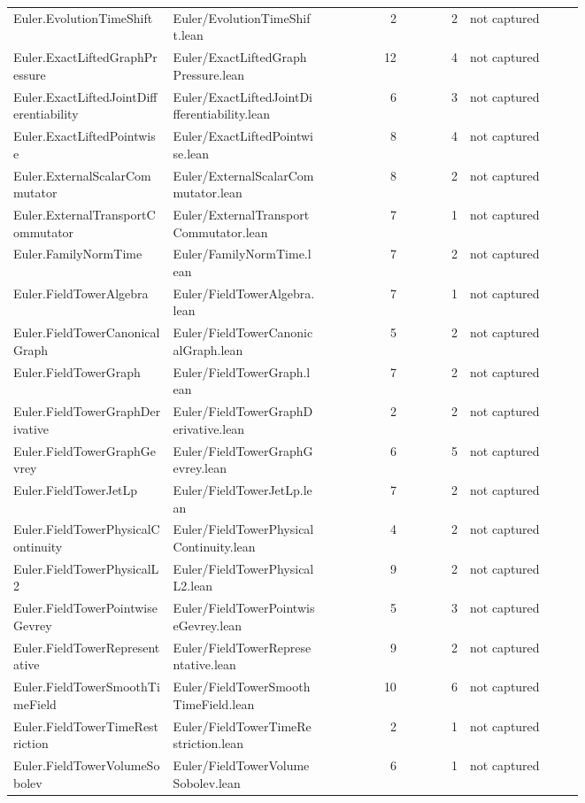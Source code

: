 \documentclass[10pt]{article}
\begin{document}
\begin{longtable}{p{0.28\linewidth}p{0.27\linewidth}r r p{0.20\linewidth}}
Euler.EvolutionTimeShift & Euler/EvolutionTimeShift.lean & 2 & 2 & not captured\\
Euler.ExactLiftedGraphPressure & Euler/ExactLiftedGraphPressure.lean & 12 & 4 & not captured\\
Euler.ExactLiftedJointDifferentiability & Euler/ExactLiftedJointDifferentiability.lean & 6 & 3 & not captured\\
Euler.ExactLiftedPointwise & Euler/ExactLiftedPointwise.lean & 8 & 4 & not captured\\
Euler.ExternalScalarCommutator & Euler/ExternalScalarCommutator.lean & 8 & 2 & not captured\\
Euler.ExternalTransportCommutator & Euler/ExternalTransportCommutator.lean & 7 & 1 & not captured\\
Euler.FamilyNormTime & Euler/FamilyNormTime.lean & 7 & 2 & not captured\\
Euler.FieldTowerAlgebra & Euler/FieldTowerAlgebra.lean & 7 & 1 & not captured\\
Euler.FieldTowerCanonicalGraph & Euler/FieldTowerCanonicalGraph.lean & 5 & 2 & not captured\\
Euler.FieldTowerGraph & Euler/FieldTowerGraph.lean & 7 & 2 & not captured\\
Euler.FieldTowerGraphDerivative & Euler/FieldTowerGraphDerivative.lean & 2 & 2 & not captured\\
Euler.FieldTowerGraphGevrey & Euler/FieldTowerGraphGevrey.lean & 6 & 5 & not captured\\
Euler.FieldTowerJetLp & Euler/FieldTowerJetLp.lean & 7 & 2 & not captured\\
Euler.FieldTowerPhysicalContinuity & Euler/FieldTowerPhysicalContinuity.lean & 4 & 2 & not captured\\
Euler.FieldTowerPhysicalL2 & Euler/FieldTowerPhysicalL2.lean & 9 & 2 & not captured\\
Euler.FieldTowerPointwiseGevrey & Euler/FieldTowerPointwiseGevrey.lean & 5 & 3 & not captured\\
Euler.FieldTowerRepresentative & Euler/FieldTowerRepresentative.lean & 9 & 2 & not captured\\
Euler.FieldTowerSmoothTimeField & Euler/FieldTowerSmoothTimeField.lean & 10 & 6 & not captured\\
Euler.FieldTowerTimeRestriction & Euler/FieldTowerTimeRestriction.lean & 2 & 1 & not captured\\
Euler.FieldTowerVolumeSobolev & Euler/FieldTowerVolumeSobolev.lean & 6 & 1 & not captured\\

\end{longtable}
\end{document}
